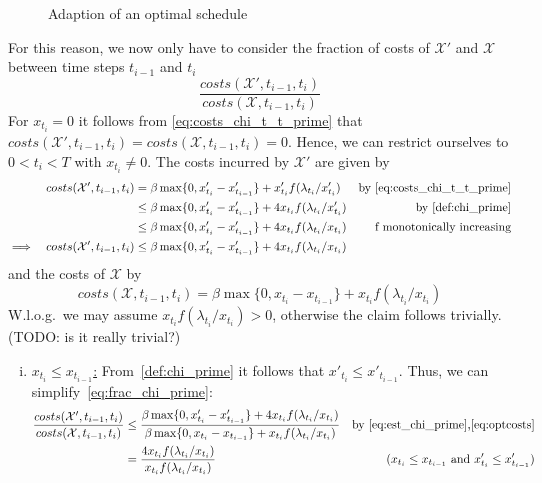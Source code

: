 \documentclass[hidelinks]{article}
\makeatletter
\renewenvironment{proof}[1][\proofname]{\par
  \vspace{-\parskip}%
  \pushQED{\qed}%
  \normalfont
  \topsep0pt \partopsep0pt %
  \trivlist
  \item[\hskip\labelsep
        \itshape
    #1\@addpunct{.}]\ignorespaces
}{%
  \popQED\endtrivlist\@endpefalse
  \addvspace{6pt plus 6pt} %
}
\theoremstyle{plain}
\theoremstyle{definition}
\theoremstyle{rem}
\newcommand{\mx}{\mathcal{X}}
\makeatother
\begin{document}
\begin{proof}
\begin{enumerate}
\begin{figure}[H]
 	\caption{Adaption of an optimal schedule}
	\label{fig:adaption-schedule}
\end{figure}
	For this reason, we now only have to consider the fraction of costs of $\mx'$ and $\mx$ between time steps $t_{i-1}$ and $t_i$
	\begin{equation}
		\frac{costs(\mx',t_{i-1},t_i)}{costs(\mx,t_{i-1},t_i)}\label{eq:frac_chi_prime}
	\end{equation}
	For $x_{t_i}=0$ it follows from \eqref{eq:costs_chi_t_t_prime} that $costs(\mx',t_{i-1},t_i)=costs(\mx,t_{i-1},t_i)=0$. Hence, we can restrict ourselves to $0<t_i<T$ with $x_{t_i}\neq 0$.
	The costs incurred by $\mx'$ are given by
	\begin{align}
		&&costs(\mx',t_{i-1},t_i)&=\beta\max\{0,x'_{t_i}-x'_{t_{i-1}}\}+x'_{t_i}f(\lambda_{t_i}/x'_{t_i})&\text{by \eqref{eq:costs_chi_t_t_prime}}\nonumber\\
		&&&\le\beta\max\{0,x'_{t_i}-x'_{t_{i-1}}\}+4x_{t_i}f(\lambda_{t_i}/x'_{t_i})&\text{by \eqref{def:chi_prime}}\nonumber\\
		&&&\le\beta\max\{0,x'_{t_i}-x'_{t_{i-1}}\}+4x_{t_i}f(\lambda_{t_i}/x_{t_i})&\text{f monotonically increasing}\nonumber\\
		\implies&&costs(\mx',t_{i-1},t_i)&\le\beta\max\{0,x'_{t_i}-x'_{t_{i-1}}\}+4x_{t_i}f(\lambda_{t_i}/x_{t_i})\label{eq:est_chi_prime}
	\end{align}
	and the costs of $\mx$ by
	\begin{equation}
		costs(\mx,t_{i-1},t_i)=\beta\max\{0,x_{t_i}-x_{t_{i-1}}\}+x_{t_i}f(\lambda_{t_i}/x_{t_i})\label{eq:optcosts}
	\end{equation}
	W.l.o.g.\ we may assume $x_{t_i}f(\lambda_{t_i}/x_{t_i})>0$, otherwise the claim follows trivially. (TODO: is it really trivial?)
	\begin{enumerate}[(i)]
		\item\label{pr:4appr_1} \underline{$x_{t_i}\le x_{t_{i-1}}$:}
			From~\eqref{def:chi_prime} it follows that $x'_{t_i}\le x'_{t_{i-1}}$. Thus, we can simplify~\eqref{eq:frac_chi_prime}:
		\begin{align*}
			\frac{costs(\mx',t_{i-1},t_i)}{costs(\mx,t_{i-1},t_i)}&\le\frac{\beta\max\{0,x'_{t_i}-x'_{t_{i-1}}\}+4x_{t_i}f(\lambda_{t_i}/x_{t_i})}{\beta\max\{0,x_{t_i}-x_{t_{i-1}}\}+x_{t_i}f(\lambda_{t_i}/x_{t_i})}&\text{by \eqref{eq:est_chi_prime},\eqref{eq:optcosts}}\\
			&=\frac{4x_{t_i}f(\lambda_{t_i}/x_{t_i})}{x_{t_i}f(\lambda_{t_i}/x_{t_i})}&\text{($x_{t_i}\le x_{t_{i-1}}$ and $x'_{t_i}\le x'_{t_{i-1}}$)}\\

\end{align*}
\end{enumerate}
\end{enumerate}
\end{proof}
\end{document}
